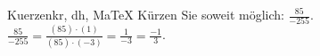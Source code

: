 \begin{MAufgabe}{Kuerzen}{kr, dh, MaTeX}
K\"urzen Sie soweit m\"oglich: $\frac{85}{-255}$.\\ 
\ifLsg\MLoesung
\quad $\frac{85}{-255}=\frac{(85)\cdot(1)}{(85)\cdot(-3)}=\frac{1}{-3}=\frac{-1}{3}$.\else\relax\fi
 \end{MAufgabe}